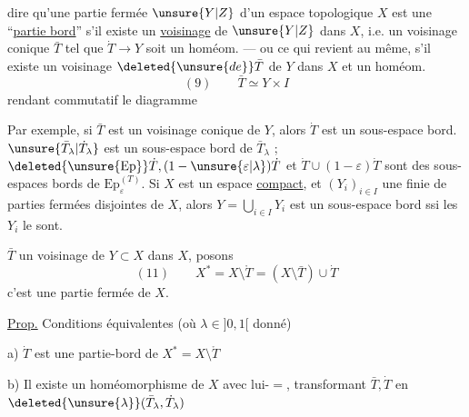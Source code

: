   dire qu'une partie fermée $\unsure{Y|Z}$ d'un
espace topologique $X$ est une ``\uline{partie bord}''
s'il existe un \uline{voisinage} 
 de $\unsure{Y|Z}$ dans $X$,
i.e. un voisinage  conique $\bar T$ tel que
$\dot T\longrightarrow Y$ soit un homéom. --- ou ce qui revient
au même,  s'il existe un
voisinage $\deleted{\unsure{de}}\bar T$ de $Y$ dans $X$ et un homéom.
\[
(9)\qquad\bar T\simeq Y\times I
\]
rendant commutatif le diagramme

Par exemple, si $\bar T$ est un voisinage  conique
 de  $Y$, alors $\dot T$ est un sous-espace bord.
 $\unsure{\bar T_\lambda|\dot T_\lambda}$ est un sous-espace bord de $\bar T_\lambda$ ;
$\deleted{\unsure{\mathrm{Ep}}}\dot T,(1-\unsure{\varepsilon|\lambda})\dot T$
et $\dot T\cup(1-\varepsilon)\dot T$ sont des sous-espaces
bords de $\mathrm{Ep}_\varepsilon^{(T)}$. 
Si $X$ est un espace
\uline{compact}, et $(Y_i)_{i\in I}$ une  finie de
parties fermées disjointes de $X$, alors
$Y=\bigcup_{i\in I}Y_i$ est un sous-espace bord ssi les $Y_i$ le sont.

 $\bar T$ un voisinage
 de $Y\subset X$
dans $X$, posons
\[
(11)\qquad X^*=X\setminus\mathring T=(X\setminus\bar T)\cup\dot T
\]
c'est une partie fermée de $X$. 

\uline{Prop.} Conditions équivalentes (où $\lambda\in]0,1[$ donné)

a) $\dot T$ est une partie-bord de $X^*=X\setminus\mathring T$

b) Il existe un homéomorphisme de $X$
avec lui-$=$, transformant $\bar T,\dot T$ en
$\deleted{\unsure{\lambda}}(\bar T_\lambda,\dot T_\lambda)$

